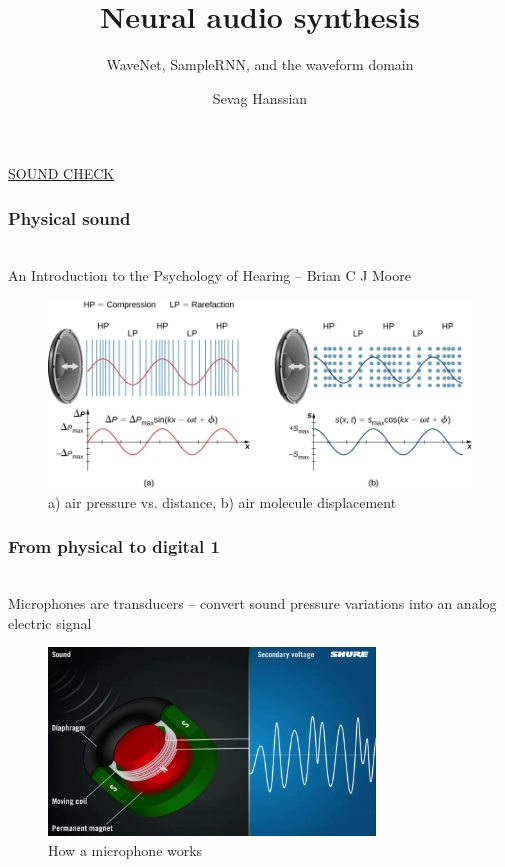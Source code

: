 \documentclass{beamer}
\title{Neural audio synthesis}
\subtitle{WaveNet, SampleRNN, and the waveform domain}
\author{Sevag Hanssian}
\institute{McGill University}
\begin{document}
\begin{frame}
\maketitle
\href{run:./funkybass.wav}{SOUND CHECK}
\end{frame}

\begin{frame}
	\frametitle{Physical sound}
	\ \\
	An Introduction to the Psychology of Hearing -- Brian C J Moore
	\begin{figure}
	\includegraphics[height=5cm]{./1_sound_pressure.jpg}
		\caption{a) air pressure vs. distance, b) air molecule displacement }
	\end{figure}
\end{frame}


\begin{frame}
	\frametitle{From physical to digital 1}
	\ \\
	Microphones are transducers -- convert sound pressure variations into an analog electric signal

	\begin{figure}
	\includegraphics[height=5cm]{./2_transducer.png}
		\caption{How a microphone works}
	\end{figure}
\end{frame}
\end{document}
